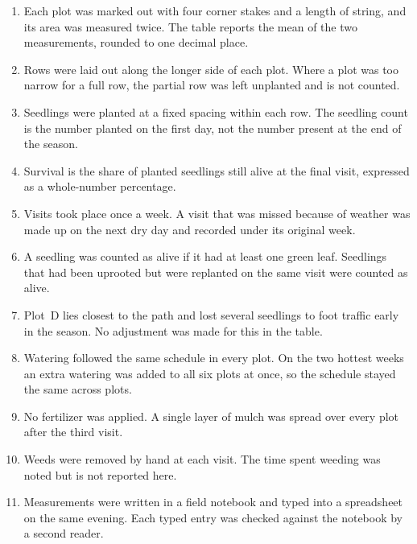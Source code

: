 \begin{enumerate}

\item
Each plot was marked out with four corner stakes and a
length of string, and its area was measured twice. The
table reports the mean of the two measurements, rounded
to one decimal place.

\item
Rows were laid out along the longer side of each plot.
Where a plot was too narrow for a full row, the partial
row was left unplanted and is not counted.

\item
Seedlings were planted at a fixed spacing within each
row. The seedling count is the number planted on the
first day, not the number present at the end of the
season.

\item
Survival is the share of planted seedlings still alive
at the final visit, expressed as a whole-number
percentage.

\item
Visits took place once a week. A visit that was missed
because of weather was made up on the next dry day and
recorded under its original week.

\item
A seedling was counted as alive if it had at least one
green leaf. Seedlings that had been uprooted but were
replanted on the same visit were counted as alive.

\item
Plot~D lies closest to the path and lost several
seedlings to foot traffic early in the season. No
adjustment was made for this in the table.

\item
Watering followed the same schedule in every plot. On
the two hottest weeks an extra watering was added to all
six plots at once, so the schedule stayed the same
across plots.

\item
No fertilizer was applied. A single layer of mulch was
spread over every plot after the third visit.

\item
Weeds were removed by hand at each visit. The time spent
weeding was noted but is not reported here.

\item
Measurements were written in a field notebook and typed
into a spreadsheet on the same evening. Each typed entry
was checked against the notebook by a second reader.


\end{enumerate}
